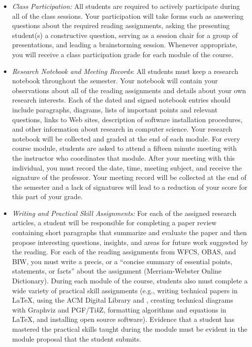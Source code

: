 \begin{itemize}

  \itemsep 0em

  \item {\em Class Participation:} All students are required to actively participate during all of the class sessions.
    Your participation will take forms such as answering questions about the required reading assignments, asking the
    presenting student(s) a constructive question, serving as a session chair for a group of presentations, and leading
    a brainstorming session. Whenever appropriate, you will receive a class participation grade for each module of the
    course.

\item {\em Research Notebook and Meeting Records}: All students must keep a research notebook throughout the semester.
  Your notebook will contain your observations about all of the reading assignments and details about your own research
  interests. Each of the dated and signed notebook entries should include paragraphs, diagrams, lists of important
  points and relevant questions, links to Web sites, description of software installation procedures, and other
  information about research in computer science. Your research notebook will be collected and graded at the end of each
  module. For every course module, students are asked to attend a fifteen minute meeting with the instructor who
  coordinates that module. After your meeting with this individual, you must record the date, time, meeting
  subject, and receive the signature of the professor. Your meeting record will be collected at the end of the semester
  and a lack of signatures will lead to a reduction of your score for this part of your grade.

\item {\em Writing and Practical Skill Assignments:} For each of the assigned research articles, a student will be
  responsible for completing a paper review containing short paragraphs that summarize and evaluate the paper and
  then propose interesting questions, insights, and areas for future work suggested by the reading. For each of the
  reading assignments from WFCS, OBAS, and BIW, you must write a precis, or a ``concise summary of essential points,
  statements, or facts'' about the assignment (Merriam-Webster Online Dictionary). During each module of the course,
  students also must complete a wide variety of practical skill assignments (e.g., writing technical papers in \LaTeX,
  using the ACM Digital Library and \BibTeX, creating technical diagrams with Graphviz and PGF/Ti\emph{k}Z, formatting
  algorithms and equations in \LaTeX, and installing open source software). Evidence that a student has mastered the
  practical skills taught during the module must be evident in the module proposal that the student submits.


\end{itemize}
